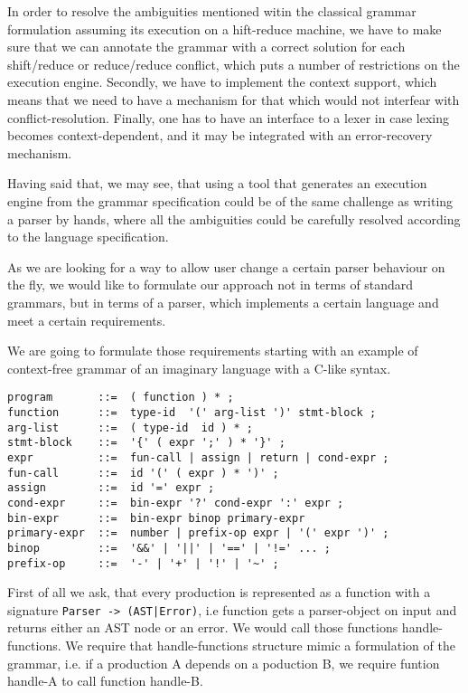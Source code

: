 In order to resolve the ambiguities mentioned witin the classical
grammar formulation assuming its execution on a hift-reduce machine,
we have to make sure that we can annotate the grammar with a correct
solution for each shift/reduce or reduce/reduce conflict, which puts
a number of restrictions on the execution engine.  Secondly, we have
to implement the context support, which means that we need to have a
mechanism for that which would not interfear with conflict-resolution.
Finally, one has to have an interface to a lexer in case lexing becomes
context-dependent, and it may be integrated with an error-recovery
mechanism.

Having said that, we may see, that using a tool that generates an
execution engine from the grammar specification could be of the same
challenge as writing a parser by hands, where all the ambiguities 
could be carefully resolved according to the language specification.

As we are looking for a way to allow user change a certain parser
behaviour on the fly, we would like to formulate our approach not 
in terms of standard grammars, but in terms of a parser, which 
implements a certain language and meet a certain requirements.

We are going to formulate those requirements starting with an example
of context-free grammar of an imaginary language with a C-like syntax.

\begin{verbatim}
program       ::=  ( function ) * ;
function      ::=  type-id  '(' arg-list ')' stmt-block ;
arg-list      ::=  ( type-id  id ) * ;
stmt-block    ::=  '{' ( expr ';' ) * '}' ;
expr          ::=  fun-call | assign | return | cond-expr ;
fun-call      ::=  id '(' ( expr ) * ')' ;
assign        ::=  id '=' expr ;
cond-expr     ::=  bin-expr '?' cond-expr ':' expr ;
bin-expr      ::=  bin-expr binop primary-expr
primary-expr  ::=  number | prefix-op expr | '(' expr ')' ;
binop         ::=  '&&' | '||' | '==' | '!=' ... ;
prefix-op     ::=  '-' | '+' | '!' | '~' ;
\end{verbatim}

First of all we ask, that every production is represented as a function
with a signature \verb/Parser -> (AST|Error)/, i.e function gets a
parser-object on input and returns either an AST node or an error.
We would call those functions handle-functions. We require that 
handle-functions structure mimic a formulation of the grammar,
i.e. if a production A depends on a poduction B, we require 
funtion handle-A to call function handle-B.

